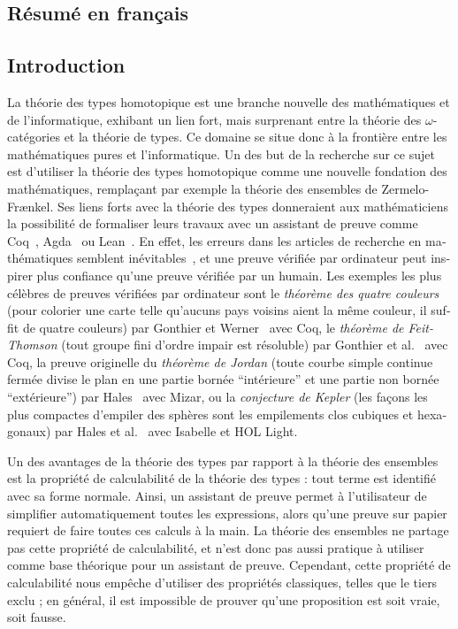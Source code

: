 \begin{otherlanguage}{french}
  
\chapter{Résumé en français}

\section{Introduction}

La théorie des types homotopique est une branche nouvelle des
mathématiques et de l'informatique, exhibant un lien fort, mais
surprenant entre la théorie des $\omega$-catégories et la théorie de
types. Ce domaine se situe donc à la frontière entre les mathématiques
pures et l'informatique. Un des but de la recherche sur ce sujet est
d'utiliser la théorie des types homotopique comme une nouvelle
fondation des mathématiques, remplaçant par exemple la théorie des
ensembles de Zermelo-Fr\ae nkel. Ses liens forts avec la théorie des
types donneraient aux mathématiciens la possibilité de formaliser
leurs travaux avec un assistant de preuve comme
Coq~\cite{coq:refman:8.4}, Agda~\cite{norell2007towards} ou
Lean~\cite{lean}. En effet, les erreurs dans les articles de recherche
en mathématiques semblent inévitables~\cite{vv-univ-f}, et une preuve
vérifiée par ordinateur peut inspirer plus confiance qu'une preuve
vérifiée par un humain. Les exemples les plus célèbres de preuves
vérifiées par ordinateur sont le {\em théorème des quatre couleurs}
(pour colorier une carte telle qu'aucuns pays voisins aient la même
couleur, il suffit de quatre couleurs) par Gonthier et
Werner~\cite{gonthier-four-color} avec Coq, le {\em théorème de
Feit-Thomson} (tout groupe fini d'ordre impair est résoluble) par
Gonthier et al.~\cite{gonthier-feit} avec Coq, la preuve originelle du
{\em théorème de Jordan} (toute courbe simple continue fermée divise le plan
en une partie bornée ``intérieure'' et une partie non bornée
``extérieure'') par Hales~\cite{hales-jordan} avec Mizar, ou la {\em
  conjecture de Kepler} (les façons les plus compactes d'empiler des
sphères sont les empilements clos cubiques et hexagonaux) par Hales et
al.~\cite{hales-kepler} avec Isabelle et HOL Light.

Un des avantages de la théorie des types par rapport à la théorie des
ensembles est la propriété de calculabilité de la théorie des types :
tout terme est identifié avec sa forme normale. Ainsi, un assistant de
preuve permet à l'utilisateur de simplifier automatiquement toutes les
expressions, alors qu'une preuve sur papier requiert de faire toutes
ces calculs à la main. La théorie des ensembles ne partage pas cette
propriété de calculabilité, et n'est donc pas aussi pratique à
utiliser comme base théorique pour un assistant de preuve. Cependant,
cette propriété de calculabilité nous empêche d'utiliser des
propriétés classiques, telles que le tiers exclu ; en général, il est
impossible de prouver qu'une proposition est soit vraie, soit fausse.


\end{otherlanguage}
